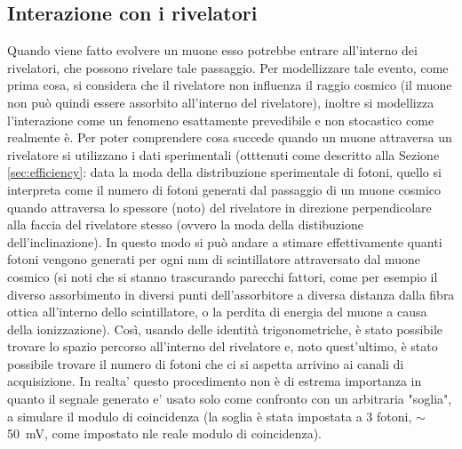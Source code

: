 \subsection{Interazione con i rivelatori}
Quando viene fatto evolvere un muone esso potrebbe entrare all'interno dei rivelatori, che possono rivelare tale passaggio. Per modellizzare tale evento, come prima cosa,
si considera che il rivelatore non influenza il raggio cosmico (il muone non può quindi essere assorbito all'interno del rivelatore), inoltre
si modellizza l'interazione come un fenomeno esattamente prevedibile e non stocastico come realmente è. Per poter comprendere cosa succede quando un muone attraversa
un rivelatore si utilizzano i dati sperimentali (otttenuti come descritto alla Sezione \ref{sec:efficiency}: data la moda della distribuzione
sperimentale di fotoni, quello si interpreta come il numero di fotoni generati dal passaggio di un muone cosmico quando attraversa lo spessore (noto) del rivelatore
in direzione perpendicolare alla faccia del rivelatore stesso (ovvero la moda della distibuzione dell'inclinazione). In questo modo si può andare a stimare effettivamente quanti fotoni vengono generati per ogni mm di scintillatore attraversato dal muone cosmico (si noti che si stanno trascurando parecchi fattori, come per esempio il diverso assorbimento in diversi punti dell'assorbitore
a diversa distanza dalla fibra ottica all'interno dello scintillatore, o la perdita di energia del muone a causa della ionizzazione). Così, usando delle identità trigonometriche, è stato possibile trovare lo spazio percorso all'interno del rivelatore e, noto quest'ultimo, è stato possibile trovare il numero di fotoni che ci si aspetta arrivino ai canali di acquisizione. In realta' questo procedimento non \`e di estrema importanza in quanto il segnale generato e' usato solo come confronto con un arbitraria "soglia", a simulare il modulo di coincidenza (la soglia \`e stata impostata a 3 fotoni, $\sim$ 50~mV, come impostato nle reale modulo di coincidenza).

